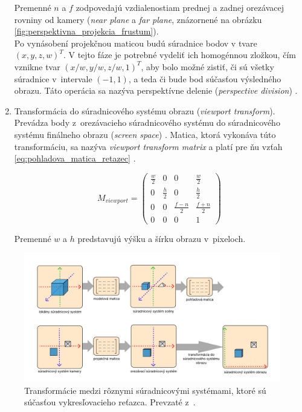 \begin{enumerate}
    Premenné $n$ a $f$ zodpovedajú vzdialenostiam prednej a zadnej orezávacej rovniny od kamery (\emph{near plane} a \emph{far plane}, znázornené na obrázku \ref{fig:perspektivna_projekcia_frustum}). \\ 
    Po vynásobení projekčnou maticou budú súradnice bodov v tvare $(x, y, z, w)^T$. V tejto fáze je potrebné vydeliť ich homogénnou zložkou, čím vznikne tvar $(x/w, y/w, z/w, 1)^T$, aby bolo možné zistiť, či sú všetky súradnice v~intervale $(-1, 1)$, a teda či bude bod súčasťou výsledného obrazu. Táto operácia sa nazýva perspektívne delenie (\emph{perspective division}) \cite{de_vries_coordinate_systems}.  
    \item Transformácia do súradnicového systému obrazu (\emph{viewport transform}). Prevádza body z~orezávacieho súradnicového systému do súradnicového systému finálneho obrazu (\emph{\mbox{screen} space}) \cite{de_vries_coordinate_systems}. Matica, ktorá vykonáva túto transformáciu, sa nazýva \emph{viewport transform matrix} a platí pre ňu vzťah \ref{eq:pohladova_matica_retazec} \cite{ahn_viewport_transform}.

    \begin{equation}
    M_{viewport} = 
    \begin{pmatrix}
    \frac{w}{2} & 0 & 0 & \frac{w}{2} \\
    0 & \frac{h}{2} & 0 & \frac{h}{2} \\
    0 & 0 & \frac{f-n}{2} & \frac{f+n}{2} \\
    0 & 0 & 0 & 1
    \end{pmatrix}
    \label{eq:pohladova_matica_retazec}
    \end{equation}
    
    Premenné $w$ a $h$ predstavujú výšku a šírku obrazu v~pixeloch.
\end{enumerate}

\begin{figure}[t]
    \centering
    \includegraphics[width=1\linewidth]{text_prace/obrazky-figures/suradnicove_systemy.pdf}
    \caption[Transformácie medzi rôznymi súradnicovými systémami, ktoré sú súčasťou vykresľovacieho reťazca.]{Transformácie medzi rôznymi súradnicovými systémami, ktoré sú súčasťou vykresľovacieho reťazca. Prevzaté z~\cite{de_vries_coordinate_systems}.}
    \label{fig:suradnicove_systemy}
\end{figure}

